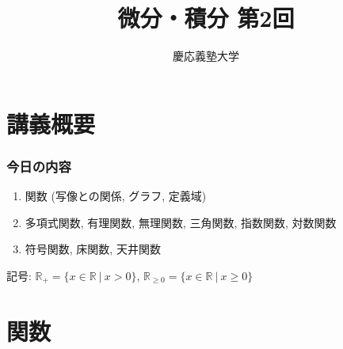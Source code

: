 \documentclass[dvipdfmx,cjk,10.2pt]{beamer}
\newcommand{\R}{\mathbb{R}}
\theoremstyle{definition}
\begin{document}
\title{微分・積分 第2回} 
\author{慶応義塾大学}            %
\date{}



\begin{frame}                  %
\titlepage                     %
\end{frame}








\section{講義概要}


\begin{frame}
\frametitle{今日の内容}



\begin{enumerate}
\item 関数 (写像との関係, グラフ, 定義域)
\item 多項式関数, 有理関数, 無理関数, 三角関数, 指数関数, 対数関数
\item 符号関数, 床関数, 天井関数
\end{enumerate} 



記号: $\R_+=\{ x \in \R \ | \ x>0\}$, $\R_{\ge0}=\{ x \in \R \ | \ x\ge 0\}$


\end{frame}





\section{関数}
\end{document}
